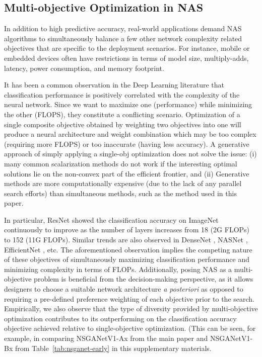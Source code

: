\documentclass[journal]{IEEEtran}
\def\ourmethod{NSGANetV1}
\theoremstyle{definition}
\theoremstyle{remark}
\begin{document}
{
\subsection{Multi-objective Optimization in NAS\label{sec:supple_mo}}
In addition to high predictive accuracy, real-world applications demand NAS algorithms to simultaneously balance a few other network complexity related objectives that are specific to the deployment scenarios. For instance, mobile or embedded devices often have restrictions in terms of model size, multiply-adds, latency, power consumption, and memory footprint. 

It has been a common observation in the Deep Learning literature that classification performance is positively correlated with the complexity of the neural network. Since we want to maximize one (performance) while minimizing the other (FLOPS), they constitute a conflicting scenario. Optimization of a single composite objective obtained by weighting two objectives into one will produce a neural architecture and weight combination which may be too complex (requiring more FLOPS) or too inaccurate (having less accuracy). A generative approach of simply applying a single-obj optimization does not solve the issue: (i) many common scalarization methods do not work if the interesting optimal solutions lie on the non-convex part of the efficient frontier, and (ii) Generative methods are more computationally expensive (due to the lack of any parallel search efforts) than simultaneous methods, such as the method used in this paper. 
    
In particular, ResNet \cite{resnet} showed the classification accuracy on ImageNet continuously to improve as the number of layers increases from 18 (2G FLOPs) to 152 (11G FLOPs). Similar trends are also observed in DenseNet \cite{densenet}, NASNet \cite{nasnet2018}, EfficientNet \cite{tan2019efficientnet}, etc. The aforementioned observation implies the competing nature of these objectives of simultaneously maximizing classification performance and minimizing complexity in terms of FLOPs. Additionally, posing NAS as a multi-objective problem is beneficial from the decision-making perspective, as it allows designers to choose a suitable network architecture \emph{a posteriori} as opposed to requiring a pre-defined preference weighting of each objective prior to the search. Empirically, we also observe that the type of diversity provided by multi-objective optimization contributes to its outperforming on the classification accuracy objective achieved relative to single-objective optimization. (This can be seen, for example, in comparing \ourmethod{}-Ax from the main paper and \ourmethod{}-Bx from Table~\ref{tab:nsganet-early} in this supplementary materials.
}
\end{document}
